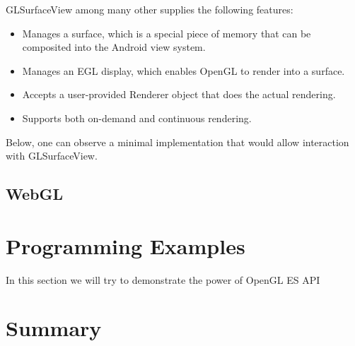 \documentclass[a4paper,11pt]{article}
\renewenvironment{abstract}
{\itshape \small
  \begin{center}
  \bfseries \abstractname\vspace{-.5em}\vspace{0pt}
  \end{center}
  \list{}{
    \setlength{\leftmargin}{1.5cm}%
    \setlength{\rightmargin}{\leftmargin}%
  }%
  \item\relax}
{\endlist}
\begin{document}
\begin{abstract}
GLSurfaceView among many other supplies the following features:
\begin{itemize}
\item Manages a surface, which is a special piece of memory that can be composited into the Android view system.
\item Manages an EGL display, which enables OpenGL to render into a surface.
\item Accepts a user-provided Renderer object that does the actual rendering.
\item Supports both on-demand and continuous rendering.
\end{itemize}

Below, one can observe a minimal implementation that would allow interaction with GLSurfaceView.



\pagebreak[3] 
\subsection{WebGL}


\clearpage 
\section{Programming Examples} 

In this section we will try to demonstrate the power of OpenGL ES API 




\section{Summary} 


\clearpage
\label{Bibliography} 
%

\footnotesize{  }
\end{document}
